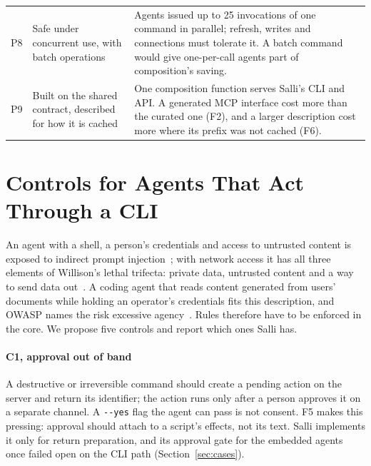 \documentclass[sigconf,nonacm]{acmart}
\newcommand{\sysA}{Salli}
\newcommand{\flag}[1]{\texttt{-\/-#1}}
\begin{document}
\begin{table}[t]
\begin{tabularx}{\textwidth}{@{}l>{\raggedright\arraybackslash}p{3.9cm}X@{}}
P8 & Safe under concurrent use, with batch operations & Agents issued up to 25 invocations of one command in parallel; refresh, writes and connections must tolerate it. A batch command would give one-per-call agents part of composition's saving. \\ \addlinespace
P9 & Built on the shared contract, described for how it is cached & One composition function serves \sysA{}'s CLI and API. A generated MCP interface cost more than the curated one (F2), and a larger description cost more where its prefix was not cached (F6). \\
\bottomrule
\end{tabularx}
\end{table}

\section{Controls for Agents That Act Through a CLI}
\label{sec:guardrails}

An agent with a shell, a person's credentials and access to untrusted content is exposed to indirect prompt injection~\cite{greshake2023indirect,debenedetti2024agentdojo}; with network access it has all three elements of Willison's lethal trifecta: private data, untrusted content and a way to send data out~\cite{willison2025trifecta}. A coding agent that reads content generated from users' documents while holding an operator's credentials fits this description, and OWASP names the risk excessive agency~\cite{owasp2025agency}. Rules therefore have to be enforced in the core. We propose five controls and report which ones \sysA{} has.

\paragraph{C1, approval out of band}
A destructive or irreversible command should create a pending action on the server and return its identifier; the action runs only after a person approves it on a separate channel. A \flag{yes} flag the agent can pass is not consent. F5 makes this pressing: approval should attach to a script's effects, not its text. \sysA{} implements it only for return preparation, and its approval gate for the embedded agents once failed open on the CLI path (Section~\ref{sec:cases}).
\end{document}
